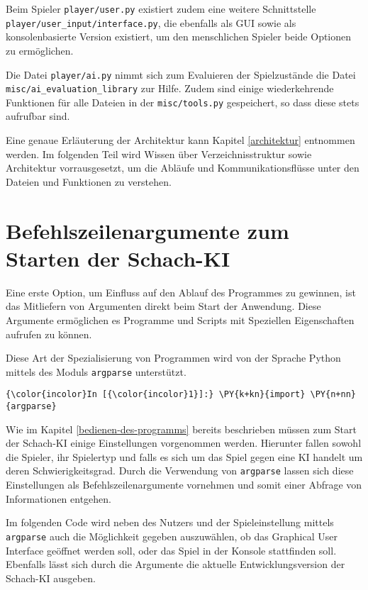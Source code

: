 Beim Spieler \texttt{player/user.py} existiert zudem eine weitere
Schnittstelle \texttt{player/user\_input/interface.py}, die ebenfalls
als GUI sowie als konsolenbasierte Version existiert, um den
menschlichen Spieler beide Optionen zu ermöglichen.

Die Datei \texttt{player/ai.py} nimmt sich zum Evaluieren der
Spielzustände die Datei \texttt{misc/ai\_evaluation\_library} zur Hilfe.
Zudem sind einige wiederkehrende Funktionen für alle Dateien in der
\texttt{misc/tools.py} gespeichert, so dass diese stets aufrufbar sind.

Eine genaue Erläuterung der Architektur kann Kapitel \ref{architektur} entnommen
werden. Im folgenden Teil wird Wissen über Verzeichnisstruktur sowie
Architektur vorrausgesetzt, um die Abläufe und Kommunikationsflüsse
unter den Dateien und Funktionen zu verstehen.

    \section{Befehlszeilenargumente zum Starten der
Schach-KI}\label{befehlszeilenargumente-zum-starten-der-schach-ki}

Eine erste Option, um Einfluss auf den Ablauf des Programmes zu
gewinnen, ist das Mitliefern von Argumenten direkt beim Start der
Anwendung. Diese Argumente ermöglichen es Programme und Scripts mit
Speziellen Eigenschaften aufrufen zu können.

Diese Art der Spezialisierung von Programmen wird von der Sprache Python
mittels des Moduls \texttt{argparse} unterstützt.

    \begin{Verbatim}[commandchars=\\\{\}]
{\color{incolor}In [{\color{incolor}1}]:} \PY{k+kn}{import} \PY{n+nn}{argparse}
\end{Verbatim}

    Wie im Kapitel \ref{bedienen-des-programms} bereits beschrieben müssen zum Start der Schach-KI
einige Einstellungen vorgenommen werden. Hierunter fallen sowohl die
Spieler, ihr Spielertyp und falls es sich um das Spiel gegen eine KI
handelt um deren Schwierigkeitsgrad. Durch die Verwendung von
\texttt{argparse} lassen sich diese Einstellungen als
Befehlszeilenargumente vornehmen und somit einer Abfrage von
Informationen entgehen.

Im folgenden Code wird neben des Nutzers und der Spieleinstellung mittels \texttt{argparse} auch die Möglichkeit gegeben auszuwählen, ob das
Graphical User Interface geöffnet werden soll, oder das Spiel in der
Konsole stattfinden soll. Ebenfalls lässt sich durch die Argumente die
aktuelle Entwicklungsversion der Schach-KI ausgeben.


